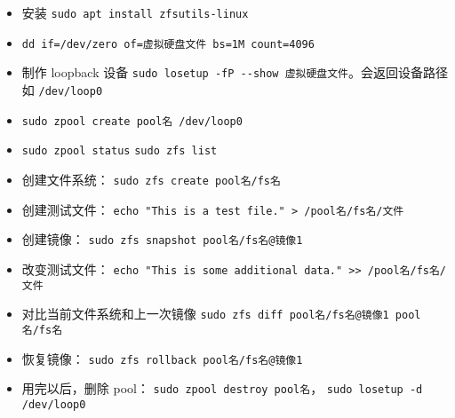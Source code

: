 
\begin{issues}
\issueDraft
\end{issues}

\begin{itemize}
\item 安装 \verb|sudo apt install zfsutils-linux|
\item \verb|dd if=/dev/zero of=虚拟硬盘文件 bs=1M count=4096|
\item 制作 loopback 设备 \verb|sudo losetup -fP --show 虚拟硬盘文件|。会返回设备路径如 \verb|/dev/loop0|
\item \verb|sudo zpool create pool名 /dev/loop0|
\item \verb|sudo zpool status| \verb|sudo zfs list|
\item 创建文件系统： \verb|sudo zfs create pool名/fs名|
\item 创建测试文件： \verb|echo "This is a test file." > /pool名/fs名/文件|
\item 创建镜像： \verb|sudo zfs snapshot pool名/fs名@镜像1|
\item 改变测试文件： \verb|echo "This is some additional data." >> /pool名/fs名/文件|
\item 对比当前文件系统和上一次镜像 \verb|sudo zfs diff pool名/fs名@镜像1 pool名/fs名|
\item 恢复镜像： \verb|sudo zfs rollback pool名/fs名@镜像1|
\item 用完以后，删除 pool： \verb|sudo zpool destroy pool名|， \verb|sudo losetup -d /dev/loop0|
\end{itemize}
